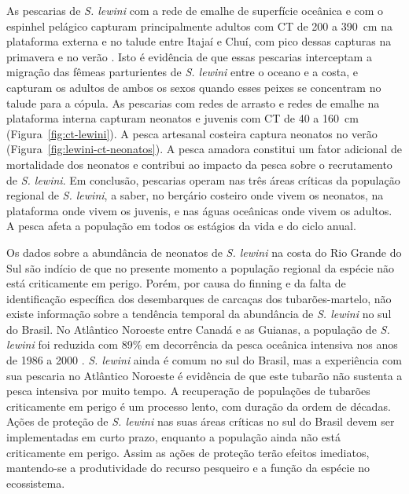 \documentclass[a4paper,11pt,twoside,showtrims,onecolumn,openright,final]{memoir}
\begin{document}


As pescarias de \emph{S. lewini} com a rede de emalhe de superfície oceânica e com o espinhel pelágico capturam 
principalmente adultos com CT de 200 a 390~cm na plataforma externa e no talude entre Itajaí e Chuí, 
com pico dessas capturas na primavera e no verão \citep{kotas2004}. %
Isto é evidência de que essas pescarias interceptam a migração das fêmeas parturientes de \emph{S. lewini}
entre o oceano e a costa, e capturam os adultos de ambos os sexos quando esses peixes se concentram no 
talude para a cópula. As pescarias com redes de arrasto e redes de emalhe  na plataforma interna 
capturam neonatos e juvenis com CT de 40 a 160~cm (Figura~\ref{fig:ct-lewini}). %
A pesca artesanal costeira captura neonatos no verão (Figura~\ref{fig:lewini-ct-neonatos}). 
A pesca amadora constitui um fator adicional de mortalidade dos neonatos e contribui 
ao impacto da pesca sobre o recrutamento de \emph{S. lewini}. Em conclusão, pescarias operam nas três 
áreas críticas da população regional de \emph{S. lewini}, a saber, no berçário costeiro onde vivem 
os neonatos, na plataforma onde vivem os juvenis, e nas águas oceânicas onde vivem os adultos. 
A pesca afeta a população em todos os estágios da vida e do ciclo anual.

Os dados sobre a abundância de neonatos de \emph{S. lewini} na costa do Rio Grande do Sul são 
indício de que no presente momento a população regional da espécie não está criticamente em perigo. 
Porém, por causa do finning e da falta de identificação específica dos desembarques de carcaças 
dos tubarões-martelo, não existe informação sobre a tendência temporal da abundância de \emph{S. lewini}
no sul do Brasil. No Atlântico Noroeste entre Canadá e as Guianas, a população de \emph{S. lewini}
foi reduzida com 89\%  em decorrência da pesca oceânica intensiva nos anos de 1986 a 2000 \citep{baum2003}. %
\emph{S. lewini} ainda é comum no sul do Brasil, mas a experiência com sua pescaria no Atlântico Noroeste 
é evidência de que este tubarão não sustenta a pesca intensiva por muito tempo. A recuperação de populações 
de tubarões criticamente em perigo é um processo lento, com duração da ordem de décadas. Ações 
de proteção de \emph{S. lewini} nas suas áreas críticas no sul do Brasil devem ser implementadas em curto prazo, 
enquanto a população ainda não está criticamente em perigo. Assim as ações de proteção terão efeitos imediatos, 
mantendo-se a produtividade do recurso pesqueiro e a função da espécie no ecossistema.
\end{document}
